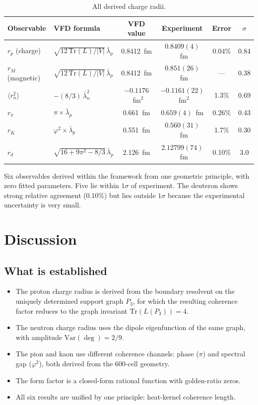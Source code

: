\documentclass[12pt]{article}
\newcommand{\phig}{\varphi}
\newcommand{\lbar}{\bar{\lambda}}
\begin{document}
\begin{table}[ht]
\centering
\caption{All derived charge radii.}
\label{tab:results}
\begin{tabular}{@{}llcccc@{}}
\toprule
Observable & VFD formula & VFD value & Experiment & Error & $\sigma$ \\
\midrule
$r_p$ (charge) & $\sqrt{12\,\mathrm{Tr}(L)/|V|}\,\lbar_p$ & 0.8412~fm & $0.8409(4)$~fm & 0.04\% & 0.84 \\
$r_M$ (magnetic) & $\sqrt{12\,\mathrm{Tr}(L)/|V|}\,\lbar_p$ & 0.8412~fm & $0.851(26)$~fm & --- & 0.38 \\
$\langle r_n^2 \rangle$ & $-(8/3)\,\lbar_n^2$ & $-0.1176$~fm$^2$ & $-0.1161(22)$~fm$^2$ & 1.3\% & 0.69 \\
$r_\pi$ & $\pi \times \lbar_p$ & 0.661~fm & $0.659(4)$~fm & 0.26\% & 0.43 \\
$r_K$ & $\phig^2 \times \lbar_p$ & 0.551~fm & $0.560(31)$~fm & 1.7\% & 0.30 \\
$r_d$ & $\sqrt{16{+}9\pi^2{-}8/3}\,\lbar_p$ & 2.126~fm & $2.12799(74)$~fm & 0.10\% & 3.0 \\
\bottomrule
\end{tabular}
\end{table}

\noindent Six observables derived within the framework from one geometric principle, with zero fitted parameters. Five lie within $1\sigma$ of experiment. The deuteron shows strong relative agreement (0.10\%) but lies outside $1\sigma$ because the experimental uncertainty is very small.

\section{Discussion}\label{sec:discussion}

\subsection{What is established}

\begin{itemize}
    \item The proton charge radius is derived from the boundary resolvent on the uniquely determined support graph $P_3$, for which the resulting coherence factor reduces to the graph invariant $\mathrm{Tr}(L(P_3)) = 4$.
    \item The neutron charge radius uses the dipole eigenfunction of the same graph, with amplitude $\mathrm{Var}(\deg) = 2/9$.
    \item The pion and kaon use different coherence channels: phase ($\pi$) and spectral gap ($\phig^2$), both derived from the 600-cell geometry.
    \item The form factor is a closed-form rational function with golden-ratio zeros.
    \item All six results are unified by one principle: heat-kernel coherence length.
\end{itemize}
\end{document}
